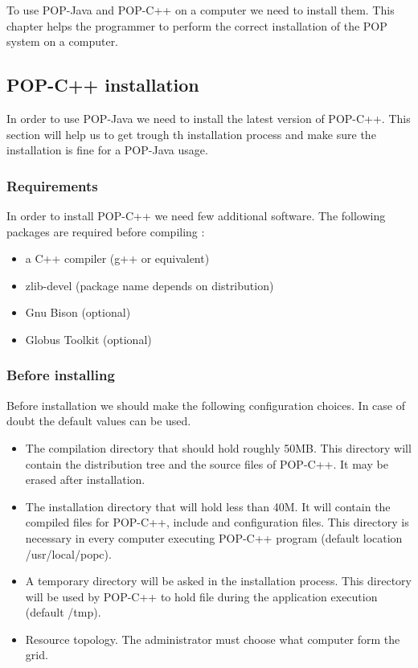 \label{install}
To use POP-Java and POP-C++ on a computer we need to install them. This chapter helps the programmer to perform the correct installation of the POP system on a computer.

\subsection{POP-C++ installation}
In order to use POP-Java we need to install the latest version of POP-C++. This section will help us to get trough th installation process and make sure the installation is fine for a POP-Java usage.

\subsubsection{Requirements}
In order to install POP-C++ we need few additional software. The following packages are required before compiling : 
\begin{itemize}
\item a C++ compiler (g++ or equivalent)
\item zlib-devel (package name depends on distribution)
\item Gnu Bison (optional)
\item Globus Toolkit (optional)
\end{itemize}

\subsubsection{Before installing}
Before installation we should make the following configuration choices. In case of doubt the default values can be used.
\begin{itemize}
\item The compilation directory that should hold roughly 50MB. This directory will contain the distribution tree and the source files of POP-C++. It may be erased after installation.
\item The installation directory that will hold less than 40M. It will contain the compiled files for POP-C++, include and configuration files. This directory is necessary in every computer executing POP-C++ program (default location /usr/local/popc).
\item A temporary directory will be asked in the installation process. This directory will be used by POP-C++ to hold file during the application execution (default /tmp).
\item Resource topology. The administrator must choose what computer form the grid.
\end{itemize}

